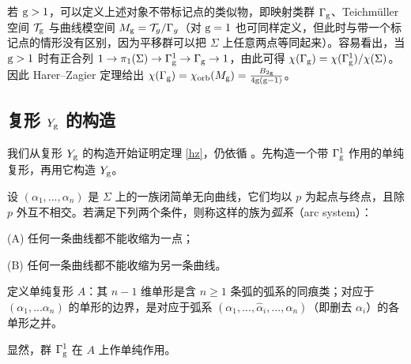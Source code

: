 \begin{remark} 若 ${\rm g}>1$，可以定义上述对象不带标记点的类似物，即映射类群 $\Gamma_{\rm g}$、Teichmüller 空间 ${\mathcal T}_{\rm g}$ 与曲线模空间 $M_{\rm g}={\mathcal T}_g/\Gamma_g$（对 ${\rm g}=1$ 也可同样定义，但此时与带一个标记点的情形没有区别，因为平移群可以把 $\Sigma$ 上任意两点等同起来）。容易看出，当 ${\rm g}>1$ 时有正合列 $1\to \pi_1(\Sigma)\to \Gamma_{\rm g}^1\to \Gamma_{\rm g}\to 1$，由此可得 $\chi(\Gamma_{\rm g})=\chi(\Gamma_{\rm g}^1)/\chi(\Sigma)$。因此 Harer–Zagier 定理给出 $\chi(\Gamma_{\rm g})=\chi_{\rm orb}(M_{\rm g})=\frac{B_{2{\rm g}}}{4{\rm g}({\rm g}-1)}$。
\end{remark}


\subsection{复形 $Y_{\rm g}$ 的构造}

我们从复形 $Y_{\rm g}$ 的构造开始证明定理 \ref{hz}，仍依循 \cite{HZ}。先构造一个带 $\Gamma_{\rm g}^1$ 作用的单纯复形，再用它构造 $Y_{\rm g}$。

设 $(\alpha_1,...,\alpha_n)$ 是 $\Sigma$ 上的一族闭简单无向曲线，它们均以 $p$ 为起点与终点，且除 $p$ 外互不相交。若满足下列两个条件，则称这样的族为\emph{弧系}（arc system）：

(A) 任何一条曲线都不能收缩为一点；

(B) 任何一条曲线都不能收缩为另一条曲线。

定义单纯复形 $A$：其 $n-1$ 维单形是含 $n\ge 1$ 条弧的弧系的同痕类；对应于 $(\alpha_1,...\alpha_n)$ 的单形的边界，是对应于弧系 $(\alpha_1,...,\widehat\alpha_i,...,\alpha_n)$（即删去 $\alpha_i$）的各单形之并。

显然，群 $\Gamma_{\rm g}^1$ 在 $A$ 上作单纯作用。

